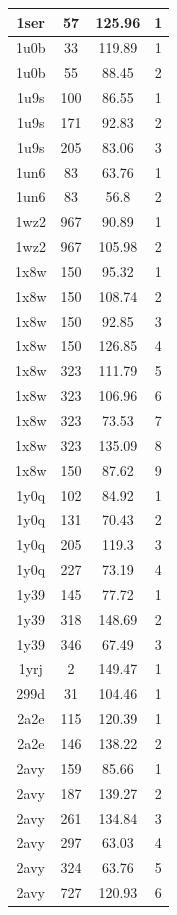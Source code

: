 \begin{center}
\begin{longtable}{c|c|c|c}
1ser & 57 & 125.96 & 1 \\ \hline
1u0b & 33 & 119.89 & 1 \\ \hline
1u0b & 55 & 88.45 & 2 \\ \hline
1u9s & 100 & 86.55 & 1 \\ \hline
1u9s & 171 & 92.83 & 2 \\ \hline
1u9s & 205 & 83.06 & 3 \\ \hline
1un6 & 83 & 63.76 & 1 \\ \hline
1un6 & 83 & 56.8 & 2 \\ \hline
1wz2 & 967 & 90.89 & 1 \\ \hline
1wz2 & 967 & 105.98 & 2 \\ \hline
1x8w & 150 & 95.32 & 1 \\ \hline
1x8w & 150 & 108.74 & 2 \\ \hline
1x8w & 150 & 92.85 & 3 \\ \hline
1x8w & 150 & 126.85 & 4 \\ \hline
1x8w & 323 & 111.79 & 5 \\ \hline
1x8w & 323 & 106.96 & 6 \\ \hline
1x8w & 323 & 73.53 & 7 \\ \hline
1x8w & 323 & 135.09 & 8 \\ \hline
1x8w & 150 & 87.62 & 9 \\ \hline
1y0q & 102 & 84.92 & 1 \\ \hline
1y0q & 131 & 70.43 & 2 \\ \hline
1y0q & 205 & 119.3 & 3 \\ \hline
1y0q & 227 & 73.19 & 4 \\ \hline
1y39 & 145 & 77.72 & 1 \\ \hline
1y39 & 318 & 148.69 & 2 \\ \hline
1y39 & 346 & 67.49 & 3 \\ \hline
1yrj & 2 & 149.47 & 1 \\ \hline
299d & 31 & 104.46 & 1 \\ \hline
2a2e & 115 & 120.39 & 1 \\ \hline
2a2e & 146 & 138.22 & 2 \\ \hline
2avy & 159 & 85.66 & 1 \\ \hline
2avy & 187 & 139.27 & 2 \\ \hline
2avy & 261 & 134.84 & 3 \\ \hline
2avy & 297 & 63.03 & 4 \\ \hline
2avy & 324 & 63.76 & 5 \\ \hline
2avy & 727 & 120.93 & 6 \\ \hline

\end{longtable}
\end{center}
